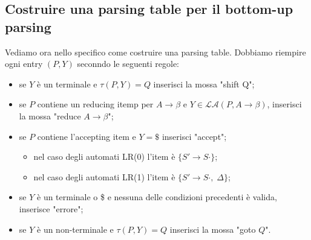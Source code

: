 \documentclass[class=book, crop=false, oneside, 12pt]{standalone}
\begin{document}
\subsection{Costruire una parsing table per il bottom-up parsing}

Vediamo ora nello specifico come costruire una parsing table.
Dobbiamo riempire ogni entry \((P, Y)\) seconndo le seguenti regole:
\begin{itemize}
    \item se \(Y\) è un terminale e \(\tau (P,Y)=Q\) inserisci la mossa "shift Q";
    \item se \(P\) contiene un reducing itemp per \(A \to \beta\) e \(Y \in \mathcal{LA}(P, A \to \beta)\), inserisci la mossa "reduce \(A \to \beta\)";
    \item se \(P\) contiene l'accepting item e \(Y=\$\) inserisci "accept";
        \begin{itemize}
            \item nel caso degli automati LR(0) l'item è \(\{S' \to S \cdot\}\);
            \item nel caso degli automati LR(1) l'item è \(\{S' \to S \cdot, \; \Delta\}\);
        \end{itemize}
    \item se \(Y\) è un terminale o \$ e nessuna delle condizioni precedenti è valida, inserisce "errore";
    \item se \(Y\) è un non-terminale e \(\tau (P, Y)=Q\) inserisci la mossa "goto \(Q\)".
\end{itemize}
\end{document}

